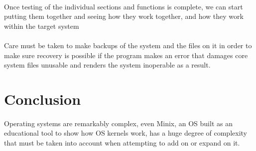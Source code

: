 \documentclass{article}
\begin{document}
    \paragraph{}Once testing of the individual sections and functions is complete, we can start putting them together and seeing how they work together, and how they work within the target system
    \paragraph{}Care must be taken to make backups of the system and the files on it in order to make sure recovery is possible if the program makes an error that damages core system files unusable and renders the system inoperable as a result.


\section{Conclusion}
    \paragraph{}Operating systems are remarkably complex, even Minix, an OS built as an educational tool to show how OS kernels work, has a huge degree of complexity that must be taken into account when attempting to add on or expand on it.

\printbibliography
\end{document}
